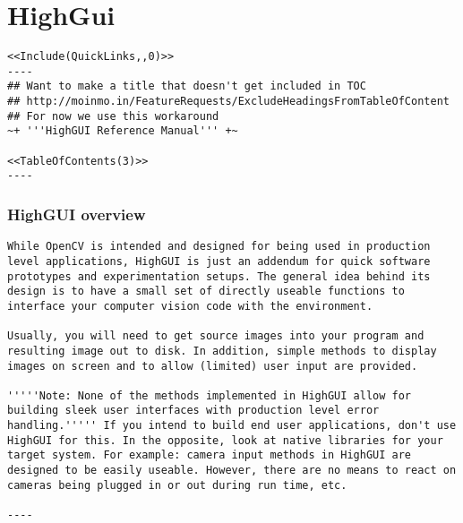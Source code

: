 \chapter{HighGui}
\begin{verbatim}
<<Include(QuickLinks,,0)>>
----
## Want to make a title that doesn't get included in TOC
## http://moinmo.in/FeatureRequests/ExcludeHeadingsFromTableOfContent
## For now we use this workaround
~+ '''HighGUI Reference Manual''' +~

<<TableOfContents(3)>>
----
\end{verbatim}
\subsection{HighGUI overview}
\begin{verbatim}
While OpenCV is intended and designed for being used in production level applications, HighGUI is just an addendum for quick software prototypes and experimentation setups. The general idea behind its design is to have a small set of directly useable functions to interface your computer vision code with the environment.

Usually, you will need to get source images into your program and resulting image out to disk. In addition, simple methods to display images on screen and to allow (limited) user input are provided.

'''''Note: None of the methods implemented in HighGUI allow for building sleek user interfaces with production level error handling.''''' If you intend to build end user applications, don't use HighGUI for this. In the opposite, look at native libraries for your target system. For example: camera input methods in HighGUI are designed to be easily useable. However, there are no means to react on cameras being plugged in or out during run time, etc.

----

\end{verbatim}
